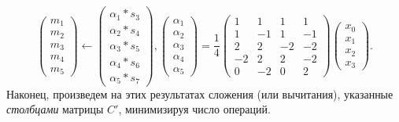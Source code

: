\documentclass{mai_book}
\begin{document}
$$\begin{pmatrix} m_1 \\ m_2 \\ m_3 \\ m_4 \\ m_5 \end{pmatrix} \longleftarrow \begin{pmatrix} \alpha_1 * s_3 \\ \alpha_2 * s_4 \\ \alpha_3 * s_5 \\ \alpha_4 * s_6 \\ \alpha_5 * s_7 \end{pmatrix}, \begin{pmatrix} \alpha_1 \\ \alpha_2 \\ \alpha_3 \\ \alpha_4 \\ \alpha_5 \end{pmatrix} = \frac{1}{4} \begin{pmatrix} 1 & 1 & 1 & 1 \\ 1 & -1 & 1 & -1 \\ 2 & 2 & -2 & -2 \\ -2 & 2 & 2 & -2 \\ 0 & -2 & 0 & 2 \end{pmatrix} \begin{pmatrix} x_0 \\ x_1 \\ x_2 \\ x_3 \end{pmatrix}.$$ Наконец, произведем на этих результатах сложения (или вычитания), указанные \textit{столбцами} матрицы $C'$, минимизируя число операций.\par
\end{document}
